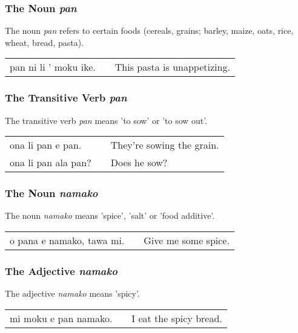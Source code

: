 \subsubsection*{The Noun \textit{pan}}
The noun \textit{pan} refers to certain foods (cereals, grains; barley, maize, oats, rice, wheat, bread, pasta).

\begin{supertabular}{p{5,5cm}|ll}
    pan ni li ' moku ike. &  & This pasta is unappetizing. \\
\end{supertabular}

\subsubsection*{The Transitive Verb \textit{pan}}

The transitive verb \textit{pan} means 'to sow' or 'to sow out'.

\begin{supertabular}{p{5,5cm}|ll}
    ona li pan e pan.   &  & They're sowing the grain. \\
    ona li pan ala pan? &  & Does he sow?              \\
\end{supertabular}

\subsubsection*{The Noun \textit{namako}}
The noun \textit{namako} means 'spice', 'salt' or 'food additive'.

\begin{supertabular}{p{5,5cm}|ll}
    o pana e namako, tawa mi. &  & Give me some spice. \\
\end{supertabular}

\subsubsection*{The Adjective \textit{namako}}
The adjective \textit{namako} means 'spicy'.

\begin{supertabular}{p{5,5cm}|ll}
    mi moku e pan namako. &  & I eat the spicy bread. \\
\end{supertabular}

